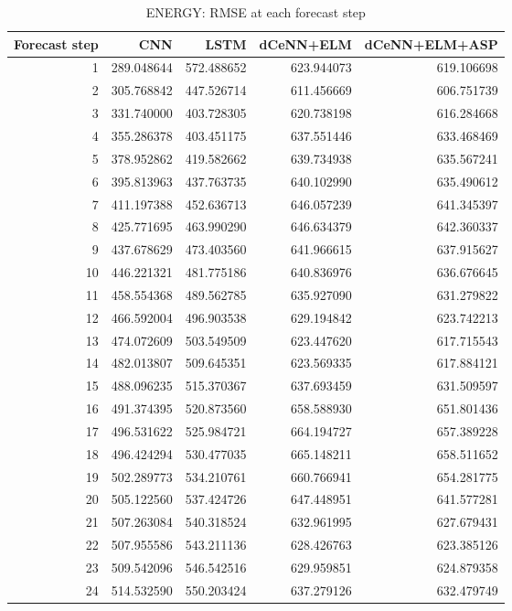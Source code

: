 \begin{table}
\caption{ENERGY: RMSE at each forecast step}
\begin{tabular}{rrrrr}
\toprule
Forecast step & CNN & LSTM & dCeNN+ELM & dCeNN+ELM+ASP \\
\midrule
1 & 289.048644 & 572.488652 & 623.944073 & 619.106698 \\
2 & 305.768842 & 447.526714 & 611.456669 & 606.751739 \\
3 & 331.740000 & 403.728305 & 620.738198 & 616.284668 \\
4 & 355.286378 & 403.451175 & 637.551446 & 633.468469 \\
5 & 378.952862 & 419.582662 & 639.734938 & 635.567241 \\
6 & 395.813963 & 437.763735 & 640.102990 & 635.490612 \\
7 & 411.197388 & 452.636713 & 646.057239 & 641.345397 \\
8 & 425.771695 & 463.990290 & 646.634379 & 642.360337 \\
9 & 437.678629 & 473.403560 & 641.966615 & 637.915627 \\
10 & 446.221321 & 481.775186 & 640.836976 & 636.676645 \\
11 & 458.554368 & 489.562785 & 635.927090 & 631.279822 \\
12 & 466.592004 & 496.903538 & 629.194842 & 623.742213 \\
13 & 474.072609 & 503.549509 & 623.447620 & 617.715543 \\
14 & 482.013807 & 509.645351 & 623.569335 & 617.884121 \\
15 & 488.096235 & 515.370367 & 637.693459 & 631.509597 \\
16 & 491.374395 & 520.873560 & 658.588930 & 651.801436 \\
17 & 496.531622 & 525.984721 & 664.194727 & 657.389228 \\
18 & 496.424294 & 530.477035 & 665.148211 & 658.511652 \\
19 & 502.289773 & 534.210761 & 660.766941 & 654.281775 \\
20 & 505.122560 & 537.424726 & 647.448951 & 641.577281 \\
21 & 507.263084 & 540.318524 & 632.961995 & 627.679431 \\
22 & 507.955586 & 543.211136 & 628.426763 & 623.385126 \\
23 & 509.542096 & 546.542516 & 629.959851 & 624.879358 \\
24 & 514.532590 & 550.203424 & 637.279126 & 632.479749 \\

\end{tabular}
\end{table}

